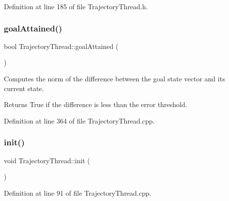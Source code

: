 Definition at line 185 of file Trajectory\+Thread.\+h.

\hypertarget{classocra__recipes_1_1TrajectoryThread_acd000c1ffee3b03d2756b04dba583285}{}\label{classocra__recipes_1_1TrajectoryThread_acd000c1ffee3b03d2756b04dba583285} 
\subsubsection{\texorpdfstring{goal\+Attained()}{goalAttained()}}
{\footnotesize\ttfamily bool Trajectory\+Thread\+::goal\+Attained (\begin{DoxyParamCaption}{ }\end{DoxyParamCaption})}

Computes the norm of the difference between the goal state vector and its current state.

\begin{DoxyReturn}{Returns}
True if the difference is less than the error threshold. 
\end{DoxyReturn}


Definition at line 364 of file Trajectory\+Thread.\+cpp.

\hypertarget{classocra__recipes_1_1TrajectoryThread_a55a2e93d3706b500338c70d4e1c406ba}{}\label{classocra__recipes_1_1TrajectoryThread_a55a2e93d3706b500338c70d4e1c406ba} 
\subsubsection{\texorpdfstring{init()}{init()}}
{\footnotesize\ttfamily void Trajectory\+Thread\+::init (\begin{DoxyParamCaption}{ }\end{DoxyParamCaption})\hspace{0.3cm}{\ttfamily [protected]}}



Definition at line 91 of file Trajectory\+Thread.\+cpp.

\hypertarget{classocra__recipes_1_1TrajectoryThread_a5ca19050f1f7f7e396c558b98c9ee8d7}{}\label{classocra__recipes_1_1TrajectoryThread_a5ca19050f1f7f7e396c558b98c9ee8d7} 
